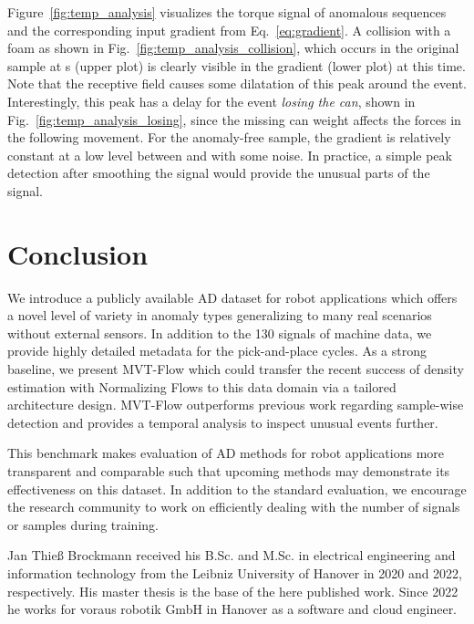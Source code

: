 \documentclass[journal]{IEEEtran}
\begin{document}
Figure~\ref{fig:temp_analysis} visualizes the torque signal of anomalous sequences and the corresponding input gradient  from Eq.~\ref{eq:gradient}.
A collision with a foam as shown in  Fig.~\ref{fig:temp_analysis_collision}, which occurs in the original sample {at  s} (upper plot) is clearly visible in the gradient (lower plot) at this time.
Note that the receptive field causes some dilatation of this peak around the event.
Interestingly, this peak has a delay for the event \textit{losing the can}, shown in Fig.~\ref{fig:temp_analysis_losing}, since the missing can weight affects the forces in the following movement.
For the anomaly-free sample, the gradient is relatively constant at a low level between  and  with some noise.
In practice, a simple peak detection after smoothing the signal would provide the unusual parts of the signal.

\section{Conclusion}
We introduce a publicly available AD dataset for robot applications which offers a novel level of variety in anomaly types generalizing to many real scenarios without external sensors.
In addition to the 130 signals of machine data, we provide highly detailed metadata for the pick-and-place cycles.
As a strong baseline, we present MVT-Flow which could transfer the recent success of density estimation with Normalizing Flows to this data domain via a tailored architecture design.
MVT-Flow outperforms previous work regarding sample-wise detection and provides a temporal analysis to inspect unusual events further.

This benchmark makes evaluation of AD methods for robot applications more transparent and comparable such that upcoming methods may demonstrate its effectiveness on this dataset.
In addition to the standard evaluation, we encourage the research community to work on efficiently dealing with the number of signals or samples during training.

{\small


}

\newcommand\vspacebio{\vspace{-1cm}}

\vspacebio{}

\begin{IEEEbiography}{Jan Thieß Brockmann}
	 received his B.Sc. and M.Sc. in electrical engineering and information technology from the Leibniz University of Hanover in 2020 and 2022, respectively. His master thesis is the base of the here published work. Since 2022 he works for voraus robotik GmbH in Hanover as a software and cloud engineer.
\end{IEEEbiography}
\end{document}
